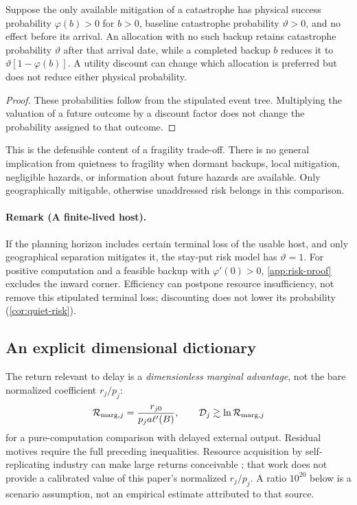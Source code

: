 \begin{corollary}
\label{cor:quiet-risk}
Suppose the only available mitigation of a catastrophe has physical
success probability $\varphi(b)>0$ for $b>0$, baseline catastrophe
probability $\vartheta>0$, and no effect before its arrival. An allocation
with no such backup retains catastrophe probability $\vartheta$ after
that arrival date, while a completed backup $b$ reduces it to
$\vartheta[1-\varphi(b)]$. A utility discount can change which allocation
is preferred but does not reduce either physical probability.
\end{corollary}
\begin{proof}
These probabilities follow from the stipulated event tree. Multiplying
the valuation of a future outcome by a discount factor does not change
the probability assigned to that outcome.
\end{proof}
This is the defensible content of a fragility trade-off. There is no
general implication from quietness to fragility when dormant backups,
local mitigation, negligible hazards, or information about future hazards
are available. Only geographically mitigable, otherwise unaddressed risk
belongs in this comparison.

\paragraph{Remark (A finite-lived host).}
If the planning horizon includes certain terminal loss of the usable host,
and only geographical separation mitigates it, the stay-put risk model has
$\vartheta=1$. For positive computation and a feasible backup with
$\varphi'(0)>0$, \cref{app:risk-proof} excludes the inward corner.
Efficiency can postpone resource insufficiency, not remove this stipulated
terminal loss; discounting does not lower its probability
(\cref{cor:quiet-risk}).

\subsection{An explicit dimensional dictionary}
The return relevant to delay is a \emph{dimensionless marginal advantage},
not the bare normalized coefficient $r_j/p_j$:
\begin{equation}
 \mathcal R_{{\rm marg},j}
   =\frac{r_{j0}}{p_j a\ell'(B)},\qquad
 \mathcal D_j\gtrsim\ln\mathcal R_{{\rm marg},j}
 \label{eq:physical-return-ratio}
\end{equation}
for a pure-computation comparison with delayed external output. Residual
motives require the full preceding inequalities. Resource acquisition by
self-replicating industry can make large returns conceivable
\citep{ArmstrongSandberg2013}; that work does not provide a calibrated
value of this paper's normalized $r_j/p_j$. A ratio $10^{20}$ below is a
scenario assumption, not an empirical estimate attributed to that source.

